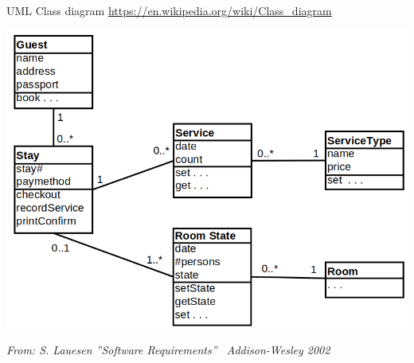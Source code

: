 \begin{Slide}{UML Class diagram}
\footnotesize\url{https://en.wikipedia.org/wiki/Class_diagram}

\begin{minipage}[t]{0.82\textwidth}
\vspace{-0.4em}\includegraphics[width=1.0\textwidth]{../img/uml-class-diagram}
\vspace{-1.4em}
\end{minipage}

{\hfill\fontsize{5}{5}\itshape\selectfont From: S. Lauesen ''Software Requirements'' \textcopyright~Addison-Wesley 2002}



\end{Slide}
